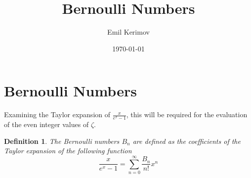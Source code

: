 \documentclass[a4paper]{article}
\title{Bernoulli Numbers}
\author{Emil Kerimov}
\date{\today}
\begin{document}
    \maketitle

    \newtheorem{theorem}{Theorem}[section]
    \newtheorem{corollary}{Corollary}[theorem]
    \newtheorem{lemma}[theorem]{Lemma}
    \newtheorem{definition}{Definition}[section]


    \section{Bernoulli Numbers}\label{sec:bernoulli-numbers}
    Examining the Taylor expansion of $\frac{x}{e^x -1}$, this will be required for the evaluation of the even integer values of $\zeta.$

    \begin{definition}
        \label{bernoulli def}
        The Bernoulli numbers $B_n$ are defined as the coefficients of the Taylor expansion of the following function
        \[\boxed{
            \frac{x}{e^x -1} = \sum_{n=0}^{\infty} \frac{B_n}{n!} x^n
        }
        \]
    \end{definition}
\end{document}
